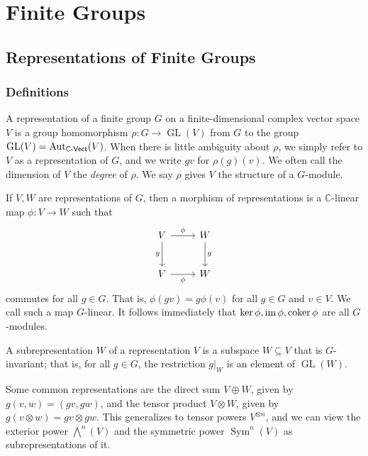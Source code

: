 \part{Finite Groups}
\chapter{Representations of Finite Groups}
\section{Definitions}
\begin{definition}[Representation]\label{dfn:1.1}
	A representation of a finite group $G$ on a finite-dimensional complex vector space $V$ is a group homomorphism $\rho : G \to \operatorname{GL} (V)$ from $G$ to the group $\operatorname{GL} (V)=\operatorname{Aut}_{\mathbb{C} \text{-}\mathsf{Vect} }(V) $. When there is little ambiguity about $\rho $, we simply refer to $V$ as a representation of $G$, and we write $gv$ for $\rho (g)(v)$. We often call the dimension of $V$ the \emph{degree} of $\rho $. We say $\rho $ gives $V$ the structure of a $G$-module.
\end{definition}

If $V,W$ are representations of $G$, then a morphism of representations is a $\mathbb{C} $-linear map $\phi : V \to W$ such that
\[\begin{tikzcd}[row sep = 2.5em, column sep = 2.5em]
	V\arrow[r, "\phi "]\arrow[d, "g"']&W\arrow[d, "g"]\\
	V\arrow[r, "\phi "']&W
\end{tikzcd}\]
commutes for all $g\in G$. That is, $\phi (gv)=g\phi (v)$ for all $g\in G$ and $v\in V$. We call such a map $G$-linear. It follows immediately that $\ker \phi ,\operatorname{im} \phi ,\operatorname{coker} \phi $ are all $G$-modules.

\begin{definition}[Subrepresentation]\label{dfn:1.2}
	A subrepresentation $W$ of a representation $V$ is a subspace $W\subseteq V$ that is $G$-invariant; that is, for all $g\in G$, the restriction $g|_W$ is an element of $\operatorname{GL} (W)$.
\end{definition}

Some common representations are the direct sum $V\oplus W$, given by $g(v,w)=(gv,gw)$, and the tensor product $V\otimes W$, given by $g(v\otimes w)=gv\otimes gw$. This generalizes to tensor powers $V^{\otimes n} $, and we can view the exterior power $\bigwedge^n(V)$ and the symmetric power $\operatorname{Sym}^n(V)$ as subrepresentations of it.

